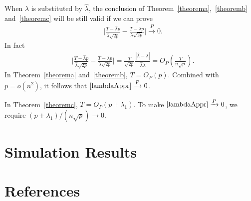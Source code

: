 \documentclass[review]{elsarticle}
\theoremstyle{plain}
\theoremstyle{definition}
\theoremstyle{remark}
\begin{document}
 When $\lambda$ is substituted by $\hat{\lambda}$,
 the conclusion of Theorem~\ref{theorema},~\ref{theoremb} and~\ref{theoremc} will be still valid if we can prove
\begin{equation}
    \begin{aligned}
        &\Big|\frac{T-{\hat{\lambda} p}}{\hat{\lambda}\sqrt{2p}}-
        \frac{T-{\lambda p}}{\lambda\sqrt{2p}}\Big|\xrightarrow{P} 0.
    \end{aligned}
\end{equation}
In fact
\begin{equation}\label{lambdaAppr}
    \begin{aligned}
        &\Big|\frac{T-{\hat{\lambda} p}}{\hat{\lambda}\sqrt{2p}}-
        \frac{T-{\lambda p}}{\lambda\sqrt{2p}}\Big|
        =\frac{T}{\sqrt{2p}}\frac{|\hat{\lambda}-\lambda|}{\hat{\lambda}\lambda}
        =O_P(\frac{T}{n\sqrt{p}}).
    \end{aligned}
\end{equation}
In Theorem~\ref{theorema} and~\ref{theoremb}, $T=O_P(p)$. Combined with $p=o(n^2)$, it follows that $\eqref{lambdaAppr}\xrightarrow{P} 0$.

In Theorem~\ref{theoremc}, $T=O_P(p+\lambda_1)$. To make $\eqref{lambdaAppr}\xrightarrow{P} 0$, we require ${(p+\lambda_1)}/{(n\sqrt{p})}\to 0$.



\section{Simulation Results}


\section*{References}

\end{document}

